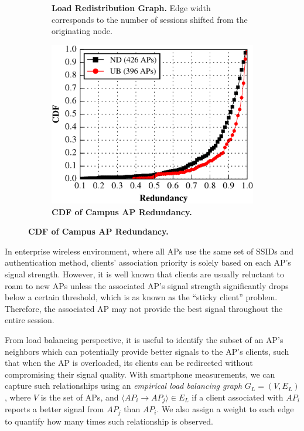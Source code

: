\begin{figure}
\begin{subfigure}[b]{0.3\textwidth}
    \caption{\textbf{Load Redistribution Graph.} Edge width corresponds to the
    number of \wifi{} sessions shifted from the originating node.}
    \label{fig:davis_load_redist}
  \end{subfigure}%
  \begin{subfigure}[b]{0.3\textwidth}
    \includegraphics[width=\columnwidth]{./figures/CampusAPRedundancyFigure.pdf}
    \caption{\textbf{CDF of Campus AP Redundancy.}}
    \label{fig:ap_redundancy}
  \end{subfigure}

  \vspace*{\aftercaptiongap}
\end{figure}

In enterprise wireless environment, where all APs use the same set of SSIDs and
authentication method, clients' association priority is solely based on each AP's
signal strength. However, it is well known that \wifi{} clients are usually
reluctant to roam to new APs unless the associated AP's signal strength
significantly drops below a certain threshold, which is as known as the ``sticky client''
problem. Therefore, the associated AP may not provide the best signal throughout
the entire \wifi{} session.

From load balancing perspective, it is useful to identify the subset of an AP's
neighbors which can potentially provide better signals to the AP's clients, such
that when the AP is overloaded, its clients can be redirected without
compromising their signal quality. With smartphone measurements, we can capture
such relationships using an \textit{empirical load balancing graph} $G_L = (V,
E_L)$, where $V$ is the set of APs, and $\langle AP_i \rightarrow AP_j \rangle
\in E_L$ if a client associated with $AP_i$ reports a better signal from $AP_j$
than $AP_i$. We also assign a weight to each edge to quantify how many times
such relationship is observed.

